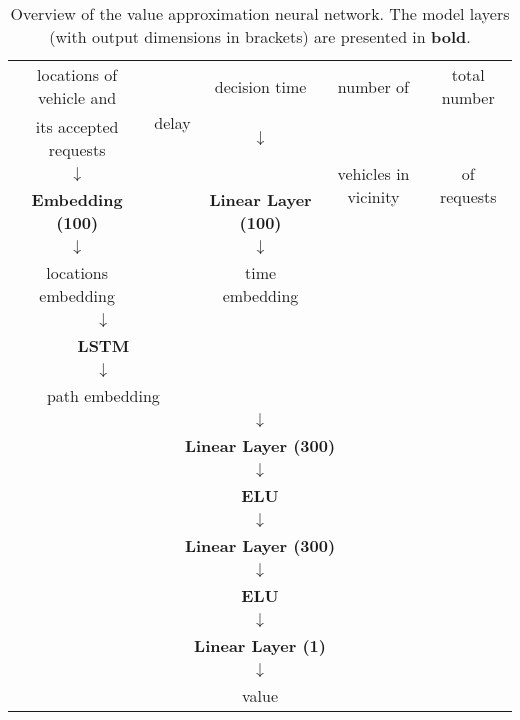 \begin{table}[!htbp]
    \small
    \centering
    \begin{tabular} { | c | c | c |c | c | }
    \hline
     locations of vehicle and& \multirow{3}{*}{delay} & decision time & number of & total number \\ 

     its accepted requests & & $\downarrow$ & \multirow{4}{*}{vehicles in vicinity} & \multirow{4}{*}{of requests} \\ 
    $\downarrow$ & & & & \\
    \textbf{Embedding (100)} & & \textbf{Linear Layer (100)} & & \\ 
    $\downarrow$ & & $\downarrow$ & & \\ 
    locations embedding &  & time embedding & &  \\ 
    \cline{1-2} 
    \multicolumn{2}{|c|}{$\downarrow$} & & & \\ 
    
    \multicolumn{2}{|c|}{\textbf{LSTM}} & & & \\ 
    
    \multicolumn{2}{|c|}{$\downarrow$} & & & \\
    \multicolumn{2}{|c|}{path embedding} & & &  \\ 
    \hline
    \multicolumn{5}{|c|}{$\downarrow$} \\
    
    \multicolumn{5}{|c|}{\textbf{Linear Layer (300)}} \\
    \multicolumn{5}{|c|}{$\downarrow$} \\
    \multicolumn{5}{|c|}{\textbf{ELU}} \\
    \multicolumn{5}{|c|}{$\downarrow$} \\
    
    \multicolumn{5}{|c|}{\textbf{Linear Layer (300)}} \\
    \multicolumn{5}{|c|}{$\downarrow$} \\
    
    \multicolumn{5}{|c|}{\textbf{ELU}} \\
    \multicolumn{5}{|c|}{$\downarrow$} \\
    
    \multicolumn{5}{|c|}{\textbf{Linear Layer (1)}} \\
    \multicolumn{5}{|c|}{$\downarrow$} \\
    
    \multicolumn{5}{|c|}{value} \\
    \hline

\end{tabular}

\caption{Overview of the value approximation neural network. The model layers (with output dimensions in brackets) are presented in \textbf{bold}. }
\label{tab:nn}

\end{table}

